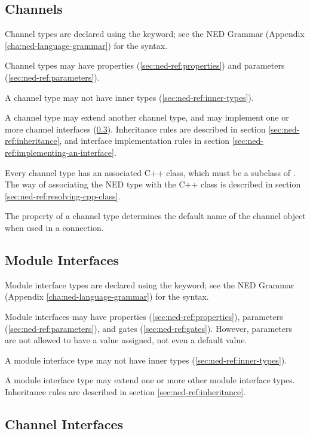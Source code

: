 \subsection{Channels}
\label{sec:ned-ref:channels}

Channel types are declared using the  keyword;
see the NED Grammar (Appendix \ref{cha:ned-language-grammar}) for the
syntax.

Channel types may have properties (\ref{sec:ned-ref:properties})
and parameters (\ref{sec:ned-ref:parameters}).

A channel type may not have inner types (\ref{sec:ned-ref:inner-types}).

A channel type may extend another channel type, and
may implement one or more channel interfaces (\ref{sec:ned-ref:channel-interfaces}).
Inheritance rules are described in section \ref{sec:ned-ref:inheritance},
and interface implementation rules in section \ref{sec:ned-ref:implementing-an-interface}.

Every channel type has an associated C++ class, which must be
a subclass of . The way of associating the
NED type with the C++ class is described in section
\ref{sec:ned-ref:resolving-cpp-class}.

The  property of a channel type determines the default name
of the channel object when used in a connection.


\subsection{Module Interfaces}
\label{sec:ned-ref:module-interfaces}

Module interface types are declared using the  keyword;
see the NED Grammar (Appendix \ref{cha:ned-language-grammar}) for the
syntax.

Module interfaces may have properties (\ref{sec:ned-ref:properties}),
parameters (\ref{sec:ned-ref:parameters}), and
gates (\ref{sec:ned-ref:gates}). However, parameters are not allowed
to have a value assigned, not even a default value.

A module interface type may not have inner types (\ref{sec:ned-ref:inner-types}).

A module interface type may extend one or more other module interface types.
Inheritance rules are described in section \ref{sec:ned-ref:inheritance}.



\subsection{Channel Interfaces}
\label{sec:ned-ref:channel-interfaces}

